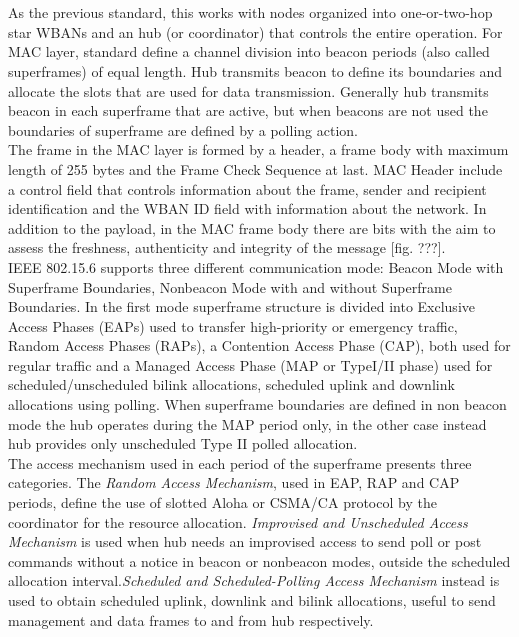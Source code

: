 \documentclass[conference]{IEEEtran}
\begin{document}
\\
\\As the previous standard, this works with nodes organized into one-or-two-hop star WBANs and an hub (or coordinator) that controls the entire operation. For MAC layer, standard define a channel division into beacon periods (also called superframes) of equal length. Hub transmits beacon to define its boundaries and allocate the slots that are used for data transmission. Generally hub transmits beacon in each superframe that are active, but when beacons are not used the boundaries of superframe are defined by a polling action.
\\The frame in the MAC layer is formed by a header, a frame body with maximum length of 255 bytes and the Frame Check Sequence at last. MAC Header include a control field that controls information about the frame, sender and recipient identification and the WBAN ID field with information about the network. In addition to the payload, in the MAC frame body there are bits with the aim to assess the freshness, authenticity and integrity of the message [fig. ???].
\\IEEE 802.15.6 supports three different communication mode: Beacon Mode with Superframe Boundaries, Nonbeacon Mode with and without Superframe Boundaries. In the first mode superframe structure is divided into Exclusive Access Phases (EAPs) used to transfer high-priority or emergency traffic, Random Access Phases (RAPs), a Contention Access Phase (CAP), both used for regular traffic and a Managed Access Phase (MAP or TypeI/II phase) used for scheduled/unscheduled bilink allocations, scheduled uplink and downlink allocations using polling. When superframe boundaries are defined in non beacon mode the hub operates during the MAP period only, in the other case instead hub provides only unscheduled Type II polled allocation.
\\The access mechanism used in each period of the superframe presents three categories. The \textit{Random Access Mechanism}, used in EAP, RAP and CAP periods, define the use of slotted Aloha or CSMA/CA protocol by the coordinator for the resource allocation. \textit{Improvised and Unscheduled Access Mechanism} is used when hub needs an improvised access to send poll or post commands without a notice in beacon or nonbeacon modes, outside the scheduled allocation interval.\textit{Scheduled and Scheduled-Polling Access Mechanism} instead is used to obtain scheduled uplink, downlink and bilink allocations, useful to send management and data frames to and from hub respectively.
\end{document}
